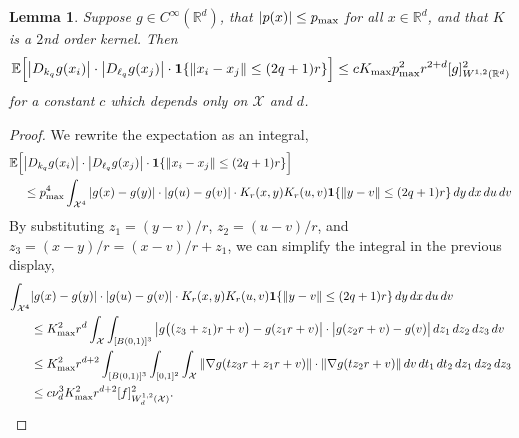 \documentclass{article}
\newcommand{\Reals}{\mathbb{R}}
\newcommand{\1}{\mathbf{1}}
\newcommand{\Rd}{\Reals^d}
\newcommand{\Xset}{\mathcal{X}}
\newcommand{\Ebb}{\mathbb{E}}
\theoremstyle{alden}
\theoremstyle{aldenthm}
\newtheorem{lemma}{Lemma}
\theoremstyle{definition}
\theoremstyle{remark}
\begin{document}
\begin{lemma}
	\label{lem:expected_first_order_seminorm_3}
	Suppose $g \in C^{\infty}(\Rd)$, that $\abs{p(x)} \leq p_{\max}$ for all $x \in \Rd$, and that $K$ is a $2$nd order kernel. Then
	\begin{equation*}
	\Ebb\Bigl[\abs{D_{k_q}g(x_i)}\cdot{\abs{D_{\ell_q}g(x_j)}}\cdot\1\{\norm{x_i - x_j} \leq (2q + 1)r\}\Bigr] \leq c K_{\max} p_{\max}^2 r^{2 + d} [g]_{W^{1,2}(\Rd)}^2
	\end{equation*}
	for a constant $c$ which depends only on $\Xset$ and $d$.
\end{lemma}
\begin{proof}
	We rewrite the expectation as an integral,
	\begin{align*}
	\Ebb\Bigl[& \abs{D_{k_q}g(x_i)}\cdot{\abs{D_{\ell_q}g(x_j)}}\cdot\1\{\norm{x_i - x_j} \leq (2q + 1)r\}\Bigr] \\
	& \leq p_{\max}^4 \int_{\Xset^4} \abs{g(x) - g(y)} \cdot \abs{g(u) - g(v)} \cdot  K_r(x,y) K_r(u,v) \1\{\norm{y - v} \leq (2q + 1)r\} \,dy \,dx \,du \,dv
	\end{align*}
	By substituting $z_1 = (y - v)/r$, $z_2 = (u - v)/r$, and $z_3 = (x - y)/r = (x - v)/r + z_1$, we can simplify the integral in the previous display,
	\begin{align*}
	\int_{\Xset^4} & \abs{g(x) - g(y)} \cdot \abs{g(u) - g(v)} \cdot K_r(x,y) K_r(u,v) \1\{\norm{y - v} \leq (2q + 1)r\} \,dy \,dx \,du \,dv \\
	& \leq K_{\max}^2 r^d \int_{\Xset} \int_{[B(0,1)]^3} \abs{g\bigl((z_3 + z_1)r + v\bigr) - g(z_1r + v)} \cdot \bigl|g(z_2r + v) - g(v)\bigr| \,dz_1 \,dz_2 \,dz_3 \,dv \\
	& \leq  K_{\max}^2 r^{d + 2} \int_{[B(0,1)]^3} \int_{[0,1]^2} \int_{\Xset} \norm{\nabla g(t z_3 r + z_1r + v)} \cdot \norm{\nabla g(t z_2 r + v)} \,dv \,dt_1 \,dt_2 \,dz_1 \,dz_2 \,dz_3 \\
	& \leq c \nu_d^3 K_{\max}^2 r^{d + 2} [f]_{W_{d}^{1,2}(\Xset)}^2.
	\end{align*}
\end{proof}
\end{document}
